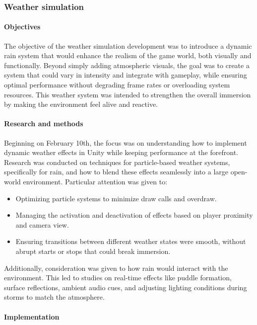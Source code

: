 \documentclass{article}
\begin{document}
\subsubsection{Weather simulation}
\paragraph{Objectives}\hfill

The objective of the weather simulation development was to introduce a dynamic rain system that would enhance the realism of the game world, both visually and functionally. Beyond simply adding atmospheric visuals, the goal was to create a system that could vary in intensity and integrate with gameplay, while ensuring optimal performance without degrading frame rates or overloading system resources. This weather system was intended to strengthen the overall immersion by making the environment feel alive and reactive.

\paragraph{Research and methods}\hfill

Beginning on February 10th, the focus was on understanding how to implement dynamic weather effects in Unity while keeping performance at the forefront. Research was conducted on techniques for particle-based weather systems, specifically for rain, and how to blend these effects seamlessly into a large open-world environment. Particular attention was given to:
\begin{itemize}
    \item Optimizing particle systems to minimize draw calls and overdraw.
    \item Managing the activation and deactivation of effects based on player proximity and camera view.
    \item Ensuring transitions between different weather states were smooth, without abrupt starts or stops that could break immersion.
\end{itemize}
Additionally, consideration was given to how rain would interact with the environment. This led to studies on real-time effects like puddle formation, surface reflections, ambient audio cues, and adjusting lighting conditions during storms to match the atmosphere.

\paragraph{Implementation}\hfill
\end{document}
